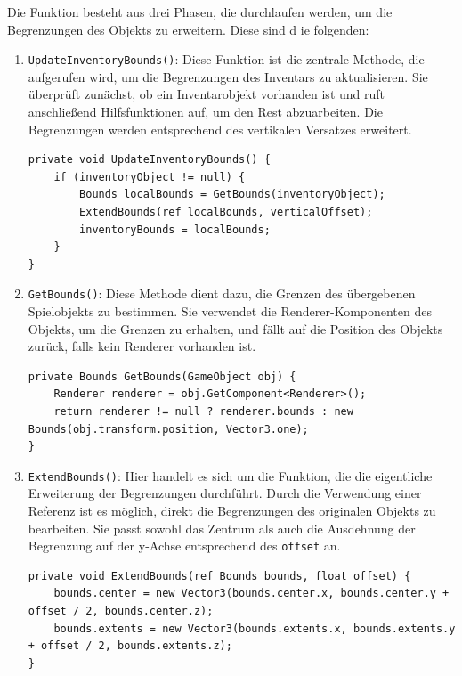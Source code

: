 Die Funktion besteht aus drei Phasen, die durchlaufen werden, um die Begrenzungen des Objekts zu erweitern. Diese sind d
ie folgenden:

\begin{enumerate}
\item \texttt{UpdateInventoryBounds()}: Diese Funktion ist die zentrale Methode, die aufgerufen wird, um die Begrenzungen
des Inventars zu aktualisieren. Sie überprüft zunächst, ob ein Inventarobjekt vorhanden ist und ruft anschließend
Hilfsfunktionen auf, um den Rest abzuarbeiten. Die Begrenzungen werden entsprechend des vertikalen Versatzes erweitert.
\begin{lstlisting}[language={[Sharp]C}]
private void UpdateInventoryBounds() {
    if (inventoryObject != null) {
        Bounds localBounds = GetBounds(inventoryObject);
        ExtendBounds(ref localBounds, verticalOffset);
        inventoryBounds = localBounds;
    }
}
\end{lstlisting}

\item \texttt{GetBounds()}: Diese Methode dient dazu, die Grenzen des übergebenen Spielobjekts zu bestimmen. Sie verwendet
die Renderer-Komponenten des Objekts, um die Grenzen zu erhalten, und fällt auf die Position des Objekts zurück, falls
kein Renderer vorhanden ist.
\begin{lstlisting}[language={[Sharp]C}]
private Bounds GetBounds(GameObject obj) {
    Renderer renderer = obj.GetComponent<Renderer>();
    return renderer != null ? renderer.bounds : new Bounds(obj.transform.position, Vector3.one);
}
\end{lstlisting}

\item \texttt{ExtendBounds()}: Hier handelt es sich um die Funktion, die die eigentliche Erweiterung der Begrenzungen
durchführt. Durch die Verwendung einer Referenz ist es möglich, direkt die Begrenzungen des originalen Objekts zu
bearbeiten. Sie passt sowohl das Zentrum als auch die Ausdehnung der Begrenzung auf der y-Achse entsprechend des \texttt{offset} an.
\begin{lstlisting}[language={[Sharp]C}]
private void ExtendBounds(ref Bounds bounds, float offset) {
    bounds.center = new Vector3(bounds.center.x, bounds.center.y + offset / 2, bounds.center.z);
    bounds.extents = new Vector3(bounds.extents.x, bounds.extents.y + offset / 2, bounds.extents.z);
}
\end{lstlisting}
\end{enumerate}

